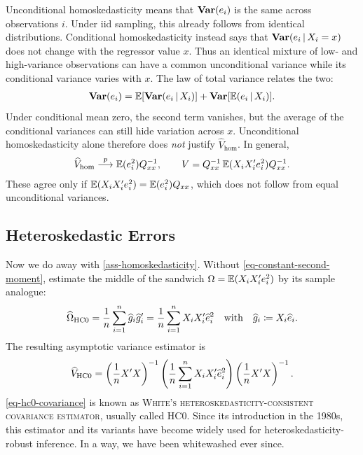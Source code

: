 \documentclass[a4paper,12pt]{article}
\begin{document}
\begin{remark}
	Unconditional homoskedasticity means that $\operatorname{\text{\textrm{\upshape\textbf{Var}}}}(e_i)$ is the same across observations $i$.
	Under \gls{iid} sampling, this already follows from identical distributions.
	Conditional homoskedasticity instead says that $\operatorname{\text{\textrm{\upshape\textbf{Var}}}}(e_i\mathpunct{}|\mathpunct{} X_i=x)$
	does not change with the regressor value $x$.
	Thus an identical mixture of low- and high-variance observations can have a common
	unconditional variance while its conditional variance varies with $x$.
	The law of total variance relates the two:
	\begin{align*}
		\operatorname{\text{\textrm{\upshape\textbf{Var}}}}(e_i)
		=\operatorname{\mathbb{E}}[\operatorname{\text{\textrm{\upshape\textbf{Var}}}}(e_i\mathpunct{}|\mathpunct{} X_i)]+\operatorname{\text{\textrm{\upshape\textbf{Var}}}}[\operatorname{\mathbb{E}}(e_i\mathpunct{}|\mathpunct{} X_i)]
		.
	\end{align*}
	Under conditional mean zero, the second term vanishes,
	but the average of the conditional variances can still hide variation across $x$.
	Unconditional homoskedasticity alone therefore does \emph{not} justify $\widehat V_{\mathrm{hom}}$.
	In general,
	\begin{align*}
		\widehat V_{\mathrm{hom}}\overset{p}{\longrightarrow}\operatorname{\mathbb{E}}(e_i^2)Q_{xx}^{-1},
		\qquad
		V=Q_{xx}^{-1}\operatorname{\mathbb{E}}(X_iX_i^{\prime} e_i^2)Q_{xx}^{-1}.
	\end{align*}
	These agree only if $\operatorname{\mathbb{E}}(X_iX_i^{\prime} e_i^2)=\operatorname{\mathbb{E}}(e_i^2)Q_{xx}$,
	which does not follow from equal unconditional variances.
\end{remark}

\subsection{Heteroskedastic Errors}

Now we do away with \autoref{ass-homoskedasticity}.
Without \eqref{eq-constant-second-moment},
estimate the middle  of the sandwich $\Omega=\operatorname{\mathbb{E}}(X_iX_i^{\prime} e_i^2)$ by its sample analogue:
\begin{align}\label{eq-omega-hc0}
	\widehat\Omega_{\mathrm{HC0}}
	= \frac1n\sum_{i=1}^n \widehat g_i \widehat g_i^{\prime}
	= \frac1n\sum_{i=1}^nX_iX_i^{\prime}\widehat e_i^2
	\quad\text{with}\quad
	\widehat g_i\coloneqq X_i\widehat e_i.
\end{align}
The resulting asymptotic variance estimator is
\begin{align}\label{eq-hc0-covariance}
	\widehat V_{\mathrm{HC0}}
	=\left(\frac1n X^{\prime} X\right)^{-1}
	\left(\frac1n \sum_{i=1}^nX_iX_i^{\prime}\widehat e_i^2\right)
	\left(\frac1n X^{\prime} X\right)^{-1}.
\end{align}
\autoref{eq-hc0-covariance} is known as \textsc{White's heteroskedasticity-consistent covariance estimator}, usually called HC0.
Since its introduction in the 1980s,
this estimator and its variants have become widely used for heteroskedasticity-robust inference.
In a way, we have been whitewashed ever since.
\end{document}
